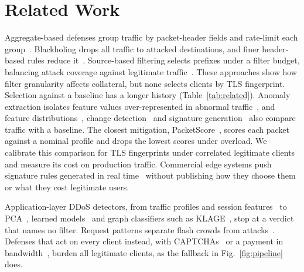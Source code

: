 \documentclass[conference,letterpaper,10pt]{IEEEtran}
\newcommand\1{\textit{(i)}}
\newcommand\2{\textit{(ii)}}
\newcommand\3{\textit{(iii)}}
\newcommand\4{\textit{(iv)}}
\newcommand\5{\textit{(v)}}
\newcommand\6{\textit{(vi)}}
\newcommand\7{\textit{(vii)}}
\newcommand\8{\textit{(viii)}}
\newcommand\9{\textit{(ix)}}
\begin{document}


\section{Related Work}
\label{sec:rw}





Aggregate-based defenses group traffic by packet-header fields and rate-limit each group~\cite{mahajan2002pushback,alcoz2022accturbo}. Blackholing drops all traffic to attacked destinations, and finer header-based rules reduce it~\cite{dietzel2018stellar}. Source-based filtering selects prefixes under a filter budget, balancing attack coverage against legitimate traffic~\cite{soldo2012filtering}. These approaches show how filter granularity affects collateral, but none selects clients by TLS fingerprint. Selection against a baseline has a longer history (Table~\ref{tab:related}). Anomaly extraction isolates feature values over-represented in abnormal traffic~\cite{silveira2010urca,brauckhoff2009extraction}, and feature distributions~\cite{lakhina2005mining}, change detection~\cite{krishnamurthy2003sketch} and signature generation~\cite{li2006hamsa} also compare traffic with a baseline. The closest mitigation, PacketScore~\cite{kim2006packetscore}, scores each packet against a nominal profile and drops the lowest scores under overload. We calibrate this comparison for TLS fingerprints under correlated legitimate clients and measure its cost on production traffic. Commercial edge systems push signature rules generated in real time~\cite{yoachimik2021dosd} without publishing how they choose them or what they cost legitimate users. 

Application-layer DDoS detectors, from traffic profiles and session features~\cite{tripathi2021application} to PCA~\cite{fernandes2015autonomous,bharathi2012pca}, learned models~\cite{kemp2023approach} and graph classifiers such as KLAGE~\cite{belcastro2025klage}, stop at a verdict that names no filter. Request patterns separate flash crowds from attacks~\cite{xie2009monitoring}. Defenses that act on every client instead, with CAPTCHAs~\cite{kandula2005botz} or a payment in bandwidth~\cite{walfish2006speakup}, burden all legitimate clients, as the fallback in Fig.~\ref{fig:pipeline} does.
\end{document}
